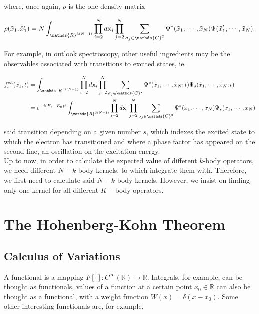 \documentclass{homework}
\begin{document}
where, once again, $\rho$ is the one-density matrix 

$$
{\rho}(\tilde{x}_1, \tilde{x}'_1) =  N \int_{\mathds{R}^{3(N-1)}} \prod_{i=2}^N d{\bf x}_i \prod_{j=2}^{N} \sum_{\sigma_j \in \mathds{C}^2} \Psi^{*}(\tilde{x}_1, \cdots, \tilde{x}_N) \Psi(\tilde{x}'_1, \cdots, \tilde{x}_N).
$$

For example, in outlook spectroscopy, other useful ingredients may be the observables associated with transitions to excited states, ie.

\begin{align}
f_{s}^{eh}(\tilde{x}_1, t) &= \int_{\mathds{R}^{3(N-1)}} \prod_{i=2}^N d{\bf x}_i \prod_{j=2}^{N} \sum_{\sigma_j \in \mathds{C}^2} \Psi^{*}(\tilde{x}_1, \cdots, \tilde{x}_N; t) \Psi_{s}(\tilde{x}_1, \cdots, \tilde{x}_N; t) \\
&= e^{-i(E_s-E_0)t} \int_{\mathds{R}^{3(N-1)}} \prod_{i=2}^N d{\bf x}_i \prod_{j=2}^{N} \sum_{\sigma_j \in \mathds{C}^2} \Psi^{*}(\tilde{x}_1, \cdots, \tilde{x}_N) \Psi_{s}(\tilde{x}_1, \cdots, \tilde{x}_N) 
\end{align}

said transition depending on a given number $s$, which indexes the excited state to which the electron has transitioned and where a phase factor has appeared on the second line, an oscillation on the excitation energy. \\

Up to now, in order to calculate the expected value of different $k$-body operators, we need different $N-k$-body kernels, to which integrate them with. Therefore, we first need to calculate said $N-k$-body kernels. However, we insist on finding only one kernel for all different $K-$body operators. \\


\section{The Hohenberg-Kohn Theorem}

\subsection{Calculus of Variations}

A functional is a mapping $F[\cdot]: C^{\infty}(\mathds{R})\rightarrow\mathds{R}$. Integrals, for example, can be thought as functionals, values of a function at a certain point $x_0 \in \mathds{R}$ can also be thought as a functional, with a weight function $W(x) = \delta(x-x_0)$. Some other interesting functionals are, for example, 
\end{document}
